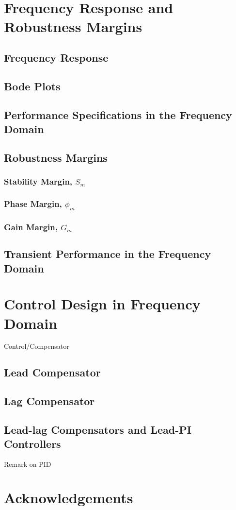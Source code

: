 \documentclass[10pt]{article}
\begin{document}
\section{Frequency Response and Robustness Margins}
\subsection{Frequency Response}
\subsection{Bode Plots}
\subsection{Performance Specifications in the Frequency Domain}
\subsection{Robustness Margins}
\subsubsection{Stability Margin, \texorpdfstring{$S_m$}{Sm}}
\subsubsection{Phase Margin, \texorpdfstring{$\phi_m$}{Pm}}
\subsubsection{Gain Margin, \texorpdfstring{$G_m$}{Gm}}
\subsection{Transient Performance in the Frequency Domain}

\section{Control Design in Frequency Domain}
Control/Compensator
\subsection{Lead Compensator}
\subsection{Lag Compensator}
\subsection{Lead-lag Compensators and Lead-PI Controllers}
Remark on PID

\section{Acknowledgements}
\end{document}
